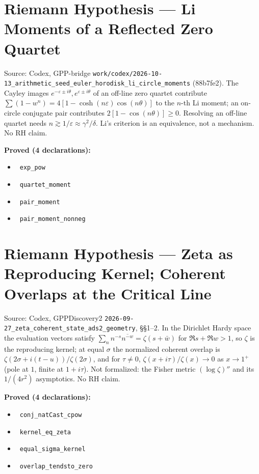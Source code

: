 \documentclass{report}
\theoremstyle{definition}
\begin{document}
\section{Riemann Hypothesis --- Li Moments of a Reflected Zero Quartet}
Source: Codex, GPP-bridge \texttt{work/codex/2026-10-13\_arithmetic\_seed\_euler\_horodisk\_li\_circle\_moments} (88b7fe2). The Cayley images $e^{-\varepsilon\pm i\theta},e^{\varepsilon\pm i\theta}$ of an off-line zero quartet contribute $\sum(1-w^n)=4[1-\cosh(n\varepsilon)\cos(n\theta)]$ to the $n$-th Li moment; an on-circle conjugate pair contributes $2[1-\cos(n\theta)]\ge0$. Resolving an off-line quartet needs $n\gtrsim1/\varepsilon\approx\gamma^2/\delta$. Li's criterion is an equivalence, not a mechanism. No RH claim.

\noindent\textbf{Proved (4 declarations):}
\begin{itemize}
  \item {}\leanok\ \texttt{exp\_pow}
  \item {}\leanok\ \texttt{quartet\_moment}
  \item {}\leanok\ \texttt{pair\_moment}
  \item {}\leanok\ \texttt{pair\_moment\_nonneg}
\end{itemize}

\section{Riemann Hypothesis --- Zeta as Reproducing Kernel; Coherent Overlaps at the Critical Line}
Source: Codex, GPPDiscovery2 \texttt{2026-09-27\_zeta\_coherent\_state\_ads2\_geometry}, \S\S1--2. In the Dirichlet Hardy space the evaluation vectors satisfy $\sum_n n^{-s}\overline{n^{-w}}=\zeta(s+\bar w)$ for $\Re s+\Re w>1$, so $\zeta$ is the reproducing kernel; at equal $\sigma$ the normalized coherent overlap is $\zeta(2\sigma+i(t-u))/\zeta(2\sigma)$, and for $\tau\ne0$, $\zeta(x+i\tau)/\zeta(x)\to0$ as $x\to1^+$ (pole at $1$, finite at $1+i\tau$). Not formalized: the Fisher metric $(\log\zeta)''$ and its $1/(4r^2)$ asymptotics. No RH claim.

\noindent\textbf{Proved (4 declarations):}
\begin{itemize}
  \item {}\leanok\ \texttt{conj\_natCast\_cpow}
  \item {}\leanok\ \texttt{kernel\_eq\_zeta}
  \item {}\leanok\ \texttt{equal\_sigma\_kernel}
  \item {}\leanok\ \texttt{overlap\_tendsto\_zero}
\end{itemize}
\end{document}
